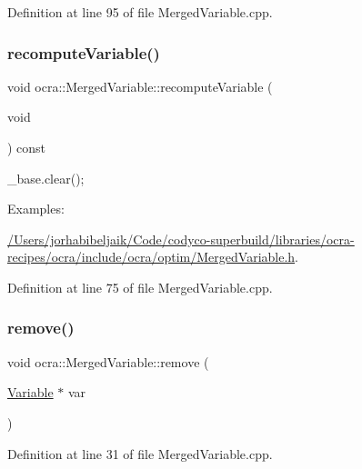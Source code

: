 Definition at line 95 of file Merged\+Variable.\+cpp.

\hypertarget{classocra_1_1MergedVariable_a5edb99e2c6596addb6b5a1c991f79699}{}\label{classocra_1_1MergedVariable_a5edb99e2c6596addb6b5a1c991f79699} 
\subsubsection{\texorpdfstring{recompute\+Variable()}{recomputeVariable()}}
{\footnotesize\ttfamily void ocra\+::\+Merged\+Variable\+::recompute\+Variable (\begin{DoxyParamCaption}\item[{void}]{ }\end{DoxyParamCaption}) const}

\+\_\+base.\+clear(); \begin{Desc}
\item[Examples\+: ]\par
\hyperlink{_2Users_2jorhabibeljaik_2Code_2codyco-superbuild_2libraries_2ocra-recipes_2ocra_2include_2ocra_27dfe52ed2d2fe1904154f5be9150e8b1}{/\+Users/jorhabibeljaik/\+Code/codyco-\/superbuild/libraries/ocra-\/recipes/ocra/include/ocra/optim/\+Merged\+Variable.\+h}.\end{Desc}


Definition at line 75 of file Merged\+Variable.\+cpp.

\hypertarget{classocra_1_1MergedVariable_ae0a14af6f9fb0b0dc72d6023e7e40069}{}\label{classocra_1_1MergedVariable_ae0a14af6f9fb0b0dc72d6023e7e40069} 
\subsubsection{\texorpdfstring{remove()}{remove()}}
{\footnotesize\ttfamily void ocra\+::\+Merged\+Variable\+::remove (\begin{DoxyParamCaption}\item[{\hyperlink{classocra_1_1Variable}{Variable} $\ast$}]{var }\end{DoxyParamCaption})}



Definition at line 31 of file Merged\+Variable.\+cpp.

